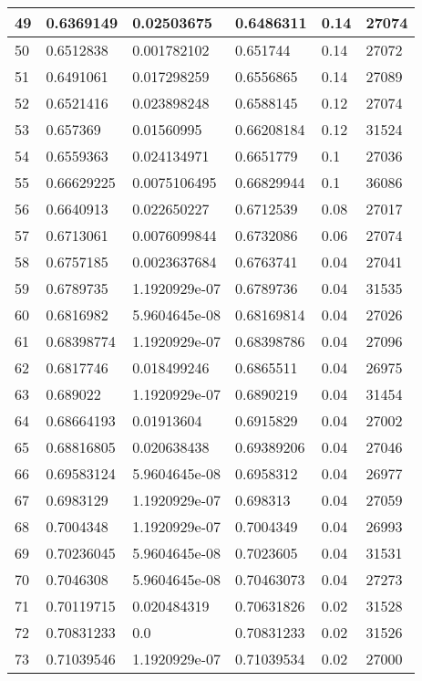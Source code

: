 \begin{longtable}{|l|l|l|l|l|l|}
49 & 0.6369149 & 0.02503675 & 0.6486311 & 0.14 & 27074 \\ \hline 
50 & 0.6512838 & 0.001782102 & 0.651744 & 0.14 & 27072 \\ \hline 
51 & 0.6491061 & 0.017298259 & 0.6556865 & 0.14 & 27089 \\ \hline 
52 & 0.6521416 & 0.023898248 & 0.6588145 & 0.12 & 27074 \\ \hline 
53 & 0.657369 & 0.01560995 & 0.66208184 & 0.12 & 31524 \\ \hline 
54 & 0.6559363 & 0.024134971 & 0.6651779 & 0.1 & 27036 \\ \hline 
55 & 0.66629225 & 0.0075106495 & 0.66829944 & 0.1 & 36086 \\ \hline 
56 & 0.6640913 & 0.022650227 & 0.6712539 & 0.08 & 27017 \\ \hline 
57 & 0.6713061 & 0.0076099844 & 0.6732086 & 0.06 & 27074 \\ \hline 
58 & 0.6757185 & 0.0023637684 & 0.6763741 & 0.04 & 27041 \\ \hline 
59 & 0.6789735 & 1.1920929e-07 & 0.6789736 & 0.04 & 31535 \\ \hline 
60 & 0.6816982 & 5.9604645e-08 & 0.68169814 & 0.04 & 27026 \\ \hline 
61 & 0.68398774 & 1.1920929e-07 & 0.68398786 & 0.04 & 27096 \\ \hline 
62 & 0.6817746 & 0.018499246 & 0.6865511 & 0.04 & 26975 \\ \hline 
63 & 0.689022 & 1.1920929e-07 & 0.6890219 & 0.04 & 31454 \\ \hline 
64 & 0.68664193 & 0.01913604 & 0.6915829 & 0.04 & 27002 \\ \hline 
65 & 0.68816805 & 0.020638438 & 0.69389206 & 0.04 & 27046 \\ \hline 
66 & 0.69583124 & 5.9604645e-08 & 0.6958312 & 0.04 & 26977 \\ \hline 
67 & 0.6983129 & 1.1920929e-07 & 0.698313 & 0.04 & 27059 \\ \hline 
68 & 0.7004348 & 1.1920929e-07 & 0.7004349 & 0.04 & 26993 \\ \hline 
69 & 0.70236045 & 5.9604645e-08 & 0.7023605 & 0.04 & 31531 \\ \hline 
70 & 0.7046308 & 5.9604645e-08 & 0.70463073 & 0.04 & 27273 \\ \hline 
71 & 0.70119715 & 0.020484319 & 0.70631826 & 0.02 & 31528 \\ \hline 
72 & 0.70831233 & 0.0 & 0.70831233 & 0.02 & 31526 \\ \hline 
73 & 0.71039546 & 1.1920929e-07 & 0.71039534 & 0.02 & 27000 \\ \hline 

\end{longtable}

